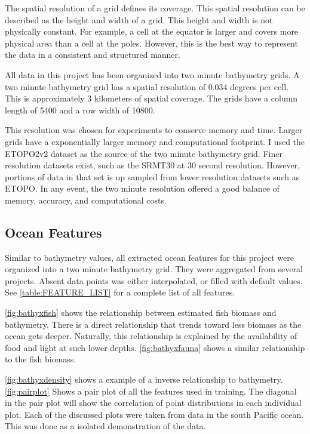 \par
The spatial resolution of a grid defines its coverage.
This spatial resolution can be described as the height and width of a grid.
This height and width is not physically constant.
For example, a cell at the equator is larger and covers more physical area than a cell at the poles.
However, this is the best way to represent the data in a consistent and structured manner.

\par
All data in this project has been organized into two minute bathymetry grids.
A two minute bathymetry grid has a spatial resolution of 0.034 degrees per cell.
This is approximately 3 kilometers of spatial coverage.
The grids have a column length of 5400 and a row width of 10800.

\par
This resolution was chosen for experiments to conserve memory and time.
Larger grids have a exponentially larger memory and computational footprint.
I used the \ac{ETOPO}2v2 \cite{national1988etopo} dataset as the source of the two minute bathymetry grid.
Finer resolution datasets exist, such as the SRMT30 \cite{becker2009global} at 30 second resolution.
However, portions of data in that set is up sampled from lower resolution datasets such as ETOPO.
In any event, the two minute resolution offered a good balance of memory, accuracy, and computational costs.

\subsection{Ocean Features}
Similar to bathymetry values, all extracted ocean features for this project were organized into a two minute bathymetry grid.
They were aggregated from several projects.
Absent data points was either interpolated, or filled with default values.
See \ref{table:FEATURE_LIST} for a complete list of all features.

\par
\ref{fig:bathyxfish} shows the relationship between estimated fish biomass and bathymetry.
There is a direct relationship that trends toward less biomass as the ocean gets deeper.
Naturally, this relationship is explained by the availability of food and light at such lower depths.
\ref{fig:bathyxfauna} shows a similar relationship to the fish biomass.

\par
\ref{fig:bathyxdensity} shows a example of a inverse relationship to bathymetry.
\ref{fig:pairplot} Shows a pair plot of all the features used in training.
The diagonal in the pair plot will show the correlation of point distributions in each individual plot.
Each of the discussed plots were taken from data in the south Pacific ocean.
This was done as a isolated demonstration of the data.


